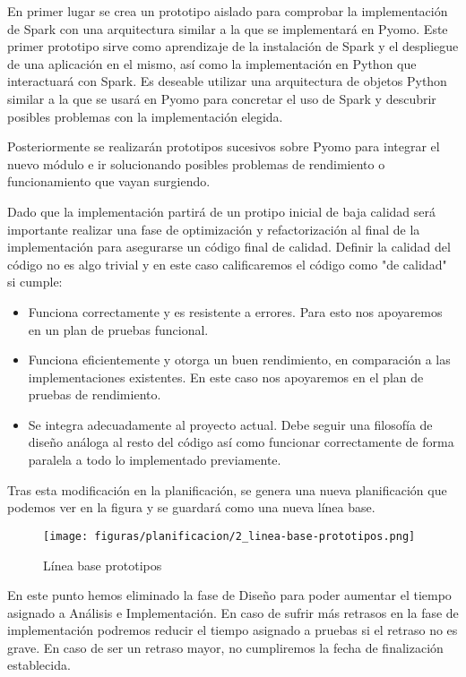 En primer lugar se crea un prototipo aislado para comprobar la implementación de Spark con una arquitectura similar a la que se implementará en Pyomo. Este primer prototipo sirve como aprendizaje de la instalación de Spark y el despliegue de una aplicación en el mismo, así como la implementación en Python que interactuará con Spark. Es deseable utilizar una arquitectura de objetos Python similar a la que se usará en Pyomo para concretar el uso de Spark y descubrir posibles problemas con la implementación elegida.

Posteriormente se realizarán prototipos sucesivos sobre Pyomo para integrar el nuevo módulo e ir solucionando posibles problemas de rendimiento o funcionamiento que vayan surgiendo. 

Dado que la implementación partirá de un protipo inicial de baja calidad será importante realizar una fase de optimización y refactorización al final de la implementación para asegurarse un código final de calidad. Definir la calidad del código no es algo trivial y en este caso calificaremos el código como "de calidad" si cumple:

\begin{itemize}
    \item Funciona correctamente y es resistente a errores. Para esto nos apoyaremos en un plan de pruebas funcional.
    \item Funciona eficientemente y otorga un buen rendimiento, en comparación a las implementaciones existentes. En este caso nos apoyaremos en el plan de pruebas de rendimiento.
    \item Se integra adecuadamente al proyecto actual. Debe seguir una filosofía de diseño análoga al resto del código así como funcionar correctamente de forma paralela a todo lo implementado previamente.
\end{itemize}

Tras esta modificación en la planificación, se genera una nueva planificación que podemos ver en la figura y se guardará como una nueva línea base.

\begin{figure}[H]
    \centerline{\texttt{[image: figuras/planificacion/2\_linea-base-prototipos.png]}}
    \caption{Línea base prototipos}
\end{figure}

En este punto hemos eliminado la fase de Diseño para poder aumentar el tiempo asignado a Análisis e Implementación. En caso de sufrir más retrasos en la fase de implementación podremos reducir el tiempo asignado a pruebas si el retraso no es grave. En caso de ser un retraso mayor, no cumpliremos la fecha de finalización establecida.

